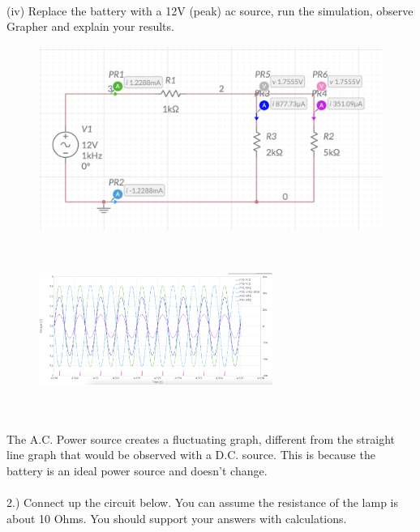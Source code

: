 \documentclass[12pt]{article}
\begin{document}
\\
(iv) Replace the battery with a 12V (peak) ac source, run the simulation, observe Grapher and explain your results.\\
\begin{figure}[!h] 
	\begin{centering}
		\includegraphics[keepaspectratio = true, width = 5in]{Q1(iv).png}
	\end{centering}
\end{figure}\\
\begin{figure}[!h] 
	\begin{centering}
		\includegraphics[keepaspectratio = true, width = 3in]{Q1(iv(i)).png}
	\end{centering}
\end{figure}\\
\\
\noindent The A.C. Power source creates a fluctuating graph, different from the straight line graph that would be observed with a D.C. source. This is because the battery is an ideal power source and doesn't change.\\
\\
2.) Connect up the circuit below. You can assume the resistance of the lamp is about 10 Ohms. You should support your answers with calculations.\\
\\
\end{document}
